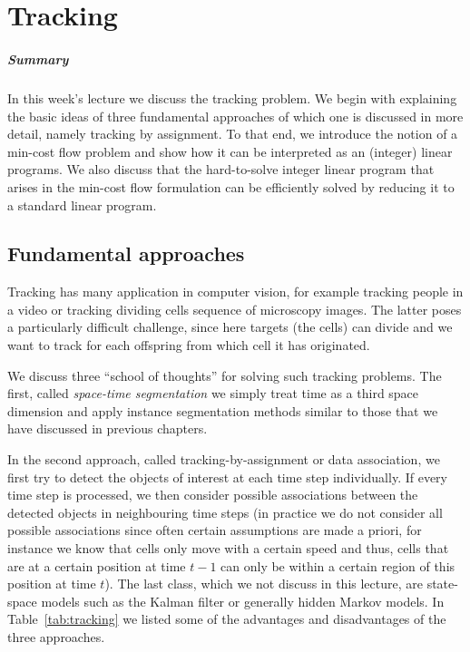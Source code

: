 \chapter{Tracking}%
\label{chap:10}

\paragraph{Summary}
In this week's lecture we discuss the tracking problem. We begin with explaining
the basic ideas of three fundamental approaches of which one is discussed in
more detail, namely tracking by assignment. To that end, we introduce the notion
of a min-cost flow problem and show how it can be interpreted as an (integer)
linear programs. We also discuss that the hard-to-solve integer linear program
that arises in the min-cost flow formulation can be efficiently solved by
reducing it to a standard linear program.

\section{Fundamental approaches}
Tracking has many application in computer vision, for example tracking people in
a video or tracking dividing cells sequence of microscopy images. The latter
poses a particularly difficult challenge, since here targets (the cells) can
divide and we want to track for each offspring from which cell it has
originated.

We discuss three ``school of thoughts'' for solving such tracking problems. The
first, called \emph{space-time segmentation} we simply treat time as a third
space dimension and apply instance segmentation methods similar to those that we
have discussed in previous chapters.

In the second approach, called tracking-by-assignment or data association, we
first try to detect the objects of interest at each time step individually. If
every time step is processed, we then consider possible associations between the
detected objects in neighbouring time steps (in practice we do not consider all
possible associations since often certain assumptions are made a priori, for
instance we know that cells only move with a certain speed and thus, cells that
are at a certain position at time $t-1$ can only be within a certain region of
this position at time $t$). The last class, which we not discuss in this
lecture, are state-space models such as the Kalman filter or generally hidden
Markov models. In Table~\ref{tab:tracking} we listed some of the advantages and
disadvantages of the three approaches.

